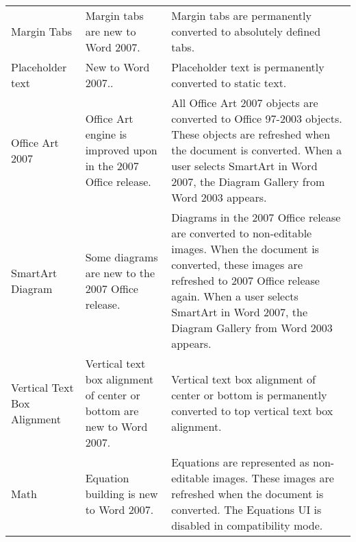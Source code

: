 \begin{center}
\begin{longtable}{p{1.1in} p{1.38in} p{3.35in}}
Margin Tabs & Margin tabs are new to Word 2007. & Margin tabs are permanently converted to absolutely defined tabs. \\
Placeholder text & New to Word 2007.. & Placeholder text is permanently converted to static text. \\
Office Art 2007 & Office Art engine is improved upon in the 2007 Office release. & All Office Art 2007 objects are converted to Office 97-2003 objects. These objects are refreshed when the document is converted. When a user selects SmartArt in Word 2007, the Diagram Gallery from Word 2003 appears. \\
SmartArt Diagram & Some diagrams are new to the 2007 Office release. & Diagrams in the 2007 Office release are converted to non-editable images. When the document is converted, these images are refreshed to 2007 Office release again. When a user selects SmartArt in Word 2007, the Diagram Gallery from Word 2003 appears. \\
Vertical Text Box Alignment & Vertical text box alignment of center or bottom are new to Word 2007. & Vertical text box alignment of center or bottom is permanently converted to top vertical text box alignment. \\
Math & Equation building is new to Word 2007. & Equations are represented as non-editable images. These images are refreshed when the document is converted. The Equations UI is disabled in compatibility mode.
\end{longtable}
\end{center}
